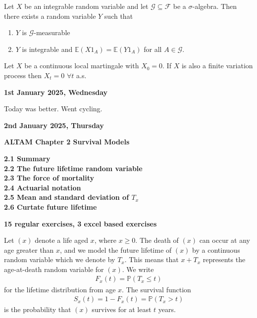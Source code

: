 \documentclass[hidelinks, 12pt]{article}
\theoremstyle{mydefstyle}
\theoremstyle{mythmstyle}
\begin{document}
Let $X$ be an integrable random variable and let $\mathcal{G} \subseteq \mathcal{F}$ be a $\sigma$-algebra. Then there exists a random variable $Y$ such that
\begin{enumerate}[label=(\alph*)]
\item $Y$ is $\mathcal{G}$-measurable
\item $Y$ is integrable and $\mathbb{E}(X1_A) = \mathbb{E}(Y1_A)$ for all $A \in \mathcal{G}$. 
\end{enumerate}

Let $X$ be a continuous local martingale with $X_0 = 0$. If $X$ is also a finite variation process then $X_t = 0$ $\forall t$ a.s.

\textbf{1st January 2025, Wednesday}

Today was better. Went cycling.

\textbf{2nd January 2025, Thursday}

\textbf{ALTAM Chapter 2 Survival Models}

\textbf{2.1 Summary} \\
\textbf{2.2 The future lifetime random variable} \\
\textbf{2.3 The force of mortality} \\
\textbf{2.4 Actuarial notation} \\
\textbf{2.5 Mean and standard deviation of $T_x$} \\
\textbf{2.6 Curtate future lifetime}

\textbf{15 regular exercises, 3 excel based exercises}

Let $(x)$ denote a life aged $x$, where $x \ge 0$. The death of $(x)$ can occur at any age greater than $x$, and we model the future lifetime of $(x)$ by a continuous random variable which we denote by $T_x$. This means that $x + T_x$ represents the age-at-death random variable for $(x)$. We write
\begin{gather*}
F_x(t) = \mathbb{P}(T_x \le t)
\end{gather*}
for the lifetime distribution from age $x$. The survival function
\begin{gather*}
S_x(t) = 1 - F_x(t) = \mathbb{P}(T_x > t)
\end{gather*}
is the probability that $(x)$ survives for at least $t$ years. 
\end{document}
